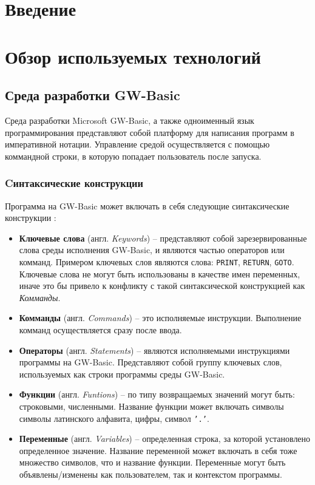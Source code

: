 \documentclass[12pt]{article}
\begin{document}
	\section{Введение}
	\newpage
	\section{Обзор используемых технологий}	
		\subsection{Среда разработки GW-Basic}
			\hspace{\parindent} Среда разработки Microsoft GW-Basic, а также одноименный язык программирования представляют собой платформу для написания программ в императивной нотации. 
			Управление средой осуществляется с помощью коммандной строки, в которую попадает пользователь после запуска.
			\subsubsection{Cинтаксические конструкции}
			\label{subsec:basicKeywords}
			\hspace{\parindent} Программа на GW-Basic может включать в себя следующие синтаксические конструкции \cite{basicManual}:
			\begin{itemize}
				\item {\bf Ключевые слова} (англ. {\it Keywords}) -- представляют собой зарезервированные слова среды исполнения GW-Basic, и являются частью операторов или комманд. Примером ключевых слов являются слова: {\tt PRINT}, {\tt RETURN}, {\tt GOTO}. Ключевые слова не могут быть использованы в качестве имен переменных, иначе это бы привело к конфликту с такой синтаксической конструкцией как {\it Комманды}.
				\item {\bf Комманды} (англ. { \it Commands}) -- это исполняемые инструкции. Выполнение комманд осуществляется сразу после ввода.
				\item {\bf Операторы} (англ. {\it Statements}) -- являются исполняемыми инструкциями программы на GW-Basic. Представляют собой группу ключевых слов, используемых как строки программы среды GW-Basic.
				\item {\bf Функции} (англ. {\it Funtions}) -- по типу возвращаемых значений могут быть: строковыми, численными. Название функции может включать символы символы латинского алфавита, цифры, символ {\tt '.'}.
				\item {\bf Переменные} (англ. {\it Variables}) -- определенная строка, за которой установлено определенное значение. Название переменной может включать в себя тоже множество символов, что и название функции. Переменные могут быть объявлены/изменены как пользователем, так и контекстом программы.
			\end{itemize}
\end{document}

